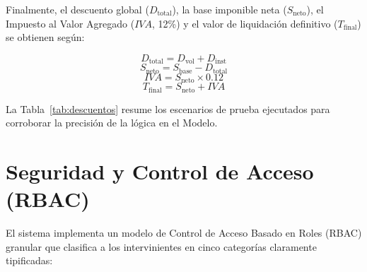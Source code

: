 \documentclass[conference]{IEEEtran}
\begin{document}
Finalmente, el descuento global ($D_{\text{total}}$), la base imponible neta ($S_{\text{neto}}$), el Impuesto al Valor Agregado ($IVA$, 12\%) y el valor de liquidación definitivo ($T_{\text{final}}$) se obtienen según:

\begin{equation}
D_{\text{total}} = D_{\text{vol}} + D_{\text{inst}}
\end{equation}
\begin{equation}
S_{\text{neto}} = S_{\text{base}} - D_{\text{total}}
\end{equation}
\begin{equation}
IVA = S_{\text{neto}} \times 0.12
\end{equation}
\begin{equation}
T_{\text{final}} = S_{\text{neto}} + IVA
\end{equation}

La Tabla~\ref{tab:descuentos} resume los escenarios de prueba ejecutados para corroborar la precisión de la lógica en el Modelo.

\begin{table}[htbp]
\caption{Matriz de Liquidación y Descuentos Dinámicos}
\label{tab:descuentos}
\centering
\setlength{\tabcolsep}{3pt}
\vspace{1ex}
\end{table}

\section{Seguridad y Control de Acceso (RBAC)}
El sistema implementa un modelo de Control de Acceso Basado en Roles (RBAC) granular que clasifica a los intervinientes en cinco categorías claramente tipificadas:
\end{document}
